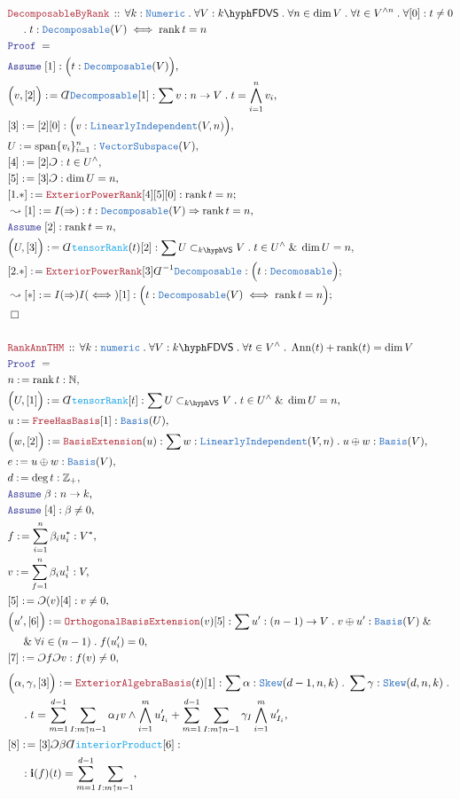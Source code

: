 \documentclass[12pt]{scrartcl}%
\newcommand{\TYPE}[1]{\textcolor{NavyBlue}{\mathtt{#1}}}%
\newcommand{\FUNC}[1]{\textcolor{Cerulean}{\mathtt{#1}}}%
\newcommand{\LOGIC}[1]{\textcolor{Blue}{\mathtt{#1}}}%
\newcommand{\THM}[1]{\textcolor{Maroon}{\mathtt{#1}}}%
\renewcommand{\.}{\; . \;} %
\newcommand{\de}{: \kern 0.1pc =} %
\newcommand{\Theorem}[2]{& \THM{#1} \, :: \, #2 \\ & \Proof = \\ } %
\newcommand{\NewLine}{\\ & \kern 1pc}%
\newcommand{\Page}[1]{ \begin{align*} #1 \end{align*}  }%
\newcommand{ \bd }{ \ByDef }%
\renewcommand{\And}{\; \& \;}%
\newcommand{\Int}{\mathbb{Z}}%
\newcommand{\Nat}{\mathbb{N}}%
\newcommand{\Imply}{\Rightarrow}
\newcommand{\Say}[3]{& #1 \de #2 : #3, \\} %
\newcommand{\Conclude}[3]{& #1 \de #2 : #3; \\}%
\newcommand{\Derive}[3]{& \leadsto #1 \de #2 : #3, \\} %
\newcommand{\DeriveConclude}[3]{& \leadsto #1 \de #2 : #3 ; \\} %
\newcommand{\Assume}[2]{& \LOGIC{Assume} \; #1 : #2, \\} %
\newcommand{\QED}{\; \square} %
\newcommand{\EndProof}{& \QED \\} %
\newcommand{\ByDef}{\rotatebox[origin=c]{-180}{$D$}}%
\newcommand{\ByConstr}{\rotatebox[origin=c]{-180}{$C$}}%
\newcommand{\Proof}{\LOGIC{Proof} \; } %
\DeclareMathOperator{\rank}{rank} %
\newcommand{\Basis}{\TYPE{Basis}} %
\newcommand{\subvec}[1]{\subset_{\VS{#1}}}%
\newcommand{\LI}{\TYPE{LinearlyIndependent}}
\DeclareMathOperator{\Span}{span} %
\DeclareMathOperator{\Ann}{Ann}   %
\newcommand{\VS}[1]{#1\hyph\mathsf{VS}} %
\newcommand{\FDVS}[1]{#1\hyph\mathsf{FDVS}} %
\begin{document}
\Page{
	\Theorem{DecomposableByRank}
	{
		\forall k : \TYPE{Numeric} \.
		\forall V : \FDVS{k} \.
		\forall n \in \dim V \.
		\forall t \in V^{\wedge n} \.
		\forall [0] : t \neq 0
		\NewLine \. 
		t : \TYPE{Decomposable}(V)
		\iff
		\rank t = n
	}
	\Assume{[1]}{\Big( t : \TYPE{Decomposable}(V) \Big)}
	\Say{\Big(v,[2]\Big)}
	{
		\bd \TYPE{Decomposable}[1]
	}
	{
		\sum v : n \to V \. t = \bigwedge^n_{i=1} v_i
	}
	\Say{[3]}{[2][0]}{\Big( v : \LI(V,n) \Big)}
	\Say{U}{\Span\{v_i\}^n_{i=1}}{\TYPE{VectorSubspace}(V)}
	\Say{[4]}{[2]\ByConstr}{t \in U^\wedge}
	\Say{[5]}{[3]\ByConstr}{\dim U = n}
	\Conclude{[1.*]}{\THM{ExteriorPowerRank}[4][5][0]}
	{
		\rank t = n
	}
	\Derive{[1]}{I(\Imply)}{
		t : \TYPE{Decomposable}(V) \Imply \rank t = n 
	}
	\Assume{[2]}{  \rank t = n }
	\Say{\Big( U, [3] \Big)}
	{
		\bd \FUNC{tensorRank}(t)[2]
	}
	{
		\sum U \subvec{k} V \.  t \in U^\wedge \And \dim U = n
	}
	\Conclude{[2.*]}{
			\THM{ExteriorPowerRank}[3]
			\bd^{-1} \TYPE{Decomposable}
		}
		{
			\Big(t : \TYPE{Decomosable}\Big) 
		}
	\DeriveConclude{[*]}{I(\Imply)I(\iff)[1]}
	{
		\Big(t : \TYPE{Decomposable}(V)
		\iff
		\rank t = n\Big)	
	}
	\EndProof
	\\
	\Theorem{RankAnnTHM}
	{
		\forall k : \TYPE{numeric} \.
		\forall V : \FDVS{k}  \.
		\forall t \in V^\wedge \.
		\Ann(t) + \rank(t) =\dim V 
	}
	\Say{n}{\rank t}{\Nat}
	\Say{\Big(U, [1] \Big)}{\bd \FUNC{tensorRank}[t]}
	{
		\sum U \subvec{k} V \.  t \in U^\wedge \And \dim U = n
	}
	\Say{u}{\THM{FreeHasBasis}[1]}
	{
		\TYPE{Basis}(U)
	}
	\Say{\Big( w, [2] \Big)}{\THM{BasisExtension}(u)}
	{
		\sum w : \LI(V,n) \. u \oplus w : \Basis(V)
	}
	\Say{e}{u \oplus w}{\Basis(V)}
	\Say{d}{\deg t}{\Int_+}
	\Assume{\beta}{n \to k}
	\Assume{[4]}{\beta \neq 0}
	\Say{f}{\sum^n_{i=1} \beta_i u^*_i}
	{
		V^{*}
	}
	\Say{v}{\sum^n_{f=1} \beta_i u^1_i }{V}
	\Say{[5]}{\ByConstr(v)[4]}{ v \neq 0}
	\Say{\Big(u',[6] \Big)}{\THM{OrthogonalBasisExtension}(v)[5]}
	{
		\sum u' : (n-1) \to V \. 
		v \oplus u' : \TYPE{Basis}(V) \And \NewLine \And 
		\forall i \in (n-1) \. f(u'_i) = 0
	}
	\Say{[7]}{\ByConstr f \ByConstr v}{f(v) \neq 0}
}\Page{
	\Say{\Big(\alpha,\gamma,[3] \Big)}
	{
		\THM{ExteriorAlgebraBasis}(t)[1]
	}
	{
		\sum \alpha : \TYPE{Skew}(d-1,n,k) \.
		\sum \gamma : \TYPE{Skew}(d,n,k) \.
		\NewLine \.
		 t = 
		 \sum^{d-1}_{m=1}\sum_{I : m \uparrow {n-1}} 
		 \alpha_I v \wedge \bigwedge^m_{i=1} u_{I_i}'
		 +
		 \sum^{d-1}_{m=1}\sum_{I : m \uparrow {n-1}} 
		 \gamma_I \bigwedge^m_{i=1} u_{I_i}'
	}
	\Say{[8]}{ [3]\ByConstr \beta \bd \FUNC{interiorProduct}[6]  }{
		\NewLine :
		\mathbf{i}(f)(t) =
		 \sum^{d-1}_{m=1}\sum_{I : m \uparrow {n-1} } 
}}
\end{document}
